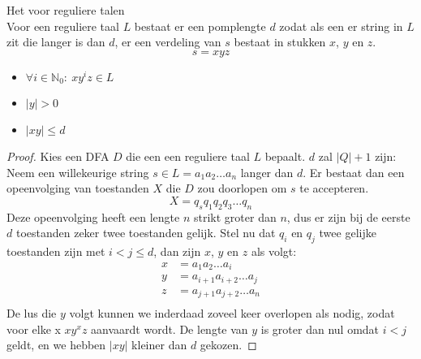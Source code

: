 \documentclass[main.tex]{subfiles}
\begin{document}
\begin{lem}
  Het  voor reguliere talen\\
  Voor een reguliere taal $L$ bestaat er een pomplengte $d$ zodat als een er string in $L$ zit die langer is dan $d$, er een verdeling van $s$ bestaat in stukken $x$, $y$ en $z$.
  \[ s = xyz \]
  \begin{itemize}
  \item $\forall i \in \mathbb{N}_{0}:\ xy^{i}z \in L$
  \item $|y| > 0$
  \item $|xy| \le d$
  \end{itemize}

  \begin{proof}
    Kies een DFA $D$ die een een reguliere taal $L$ bepaalt.
    $d$ zal $|Q| + 1$ zijn:
    Neem een willekeurige string $s\in L = a_{1}a_{2}\ldots a_{n}$ langer dan $d$.
    Er bestaat dan een opeenvolging van toestanden $X$ die $D$ zou doorlopen om $s$ te accepteren.
    \[ X = q_{s}q_{1}q_{2}q_{3}\ldots q_{n} \]
    Deze opeenvolging heeft een lengte $n$ strikt groter dan $n$, dus er zijn bij de eerste $d$ toestanden zeker twee toestanden gelijk.
    Stel nu dat $q_{i}$ en $q_{j}$ twee gelijke toestanden zijn met $i < j \le d$, dan zijn $x$, $y$ en $z$ als volgt:
    \[
    \begin{array}{rl}
      x &= a_{1}a_{2}\ldots a_{i}\\
      y &= a_{i+1}a_{i+2}\ldots a_{j}\\
      z &= a_{j+1}a_{j+2}\ldots a_{n}\\
    \end{array}
    \]
    De lus die $y$ volgt kunnen we inderdaad zoveel keer overlopen als nodig, zodat voor elke x $xy^{x}z$ aanvaardt wordt.
    De lengte van $y$ is groter dan nul omdat $i < j$ geldt, en we hebben $|xy|$ kleiner dan $d$ gekozen.
  \end{proof}
\end{lem}
\end{document}
